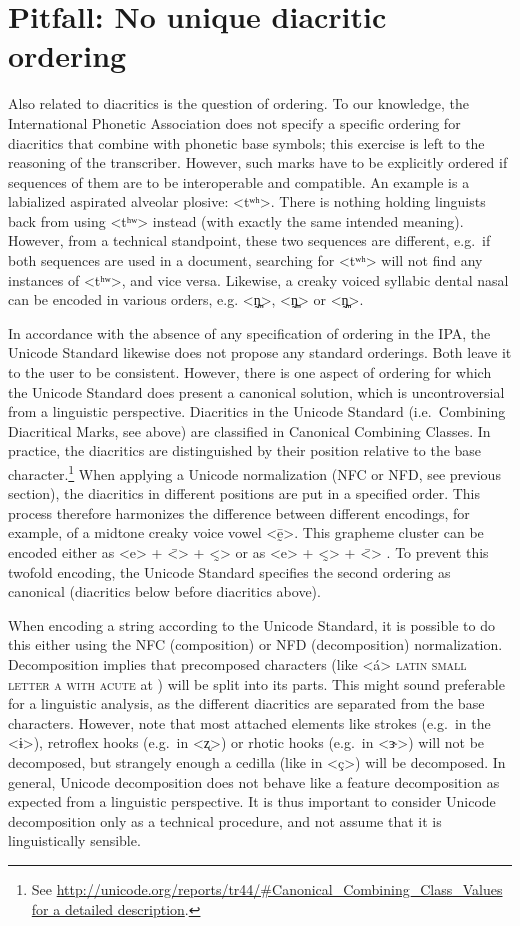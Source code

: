\section{Pitfall: No unique diacritic ordering}
\label{pitfall-no-unique-diacritic-ordering}

Also related to diacritics is the question of ordering. To our knowledge, the
International Phonetic Association does not specify a specific ordering for
diacritics that combine with phonetic base symbols; this exercise is left to the
reasoning of the transcriber. However, such marks have to be explicitly ordered
if sequences of them are to be interoperable and compatible. An example is a
labialized aspirated alveolar plosive: <tʷʰ>. There is nothing holding linguists
back from using <tʰʷ> instead (with exactly the same intended meaning). However,
from a technical standpoint, these two sequences are different, e.g.~if both
sequences are used in a document, searching for <tʷʰ> will not find any
instances of <tʰʷ>, and vice versa. Likewise, a creaky voiced syllabic dental
nasal can be encoded in various orders, e.g. <n̪̰̩>, <n̩̰̪> or <n̩̪̰>.

In accordance with the absence of any specification of ordering in the IPA, the
Unicode Standard likewise does not propose any standard orderings. Both leave it
to the user to be consistent. However, there is one aspect of ordering for which
the Unicode Standard does present a canonical solution, which is uncontroversial
from a linguistic perspective. Diacritics in the Unicode Standard
(i.e.~Combining Diacritical Marks, see above) are classified in Canonical
Combining Classes. In practice, the diacritics are distinguished by their
position relative to the base character.\footnote{See
\url{http://unicode.org/reports/tr44/\#Canonical\_Combining\_Class\_Values for a
detailed description}.} When applying a Unicode normalization (NFC or NFD, see
previous section), the diacritics in different positions are put in a specified
order. This process therefore harmonizes the difference between different
encodings, for example, of a midtone creaky voice vowel <ḛ̄>. This grapheme
cluster can be encoded either as <e> + <̄> + <̰> or as <e> + <̰> + <̄> . To
prevent this twofold encoding, the Unicode Standard specifies the second
ordering as canonical (diacritics below before diacritics above).

When encoding a string according to the Unicode Standard, it is possible to do
this either using the NFC (composition) or NFD (decomposition) normalization.
Decomposition implies that precomposed characters (like <á> \textsc{latin small
letter a with acute} at ) will be split into its parts. This might
sound preferable for a linguistic analysis, as the different diacritics are
separated from the base characters. However, note that most attached elements
like strokes (e.g.~in the <ɨ>), retroflex hooks (e.g.~in <ʐ>) or rhotic hooks
(e.g.~in <ɝ>) will not be decomposed, but strangely enough a cedilla (like in
<ç>) will be decomposed. In general, Unicode decomposition does not behave like
a feature decomposition as expected from a linguistic perspective. It is thus
important to consider Unicode decomposition only as a technical procedure, and
not assume that it is linguistically sensible.

